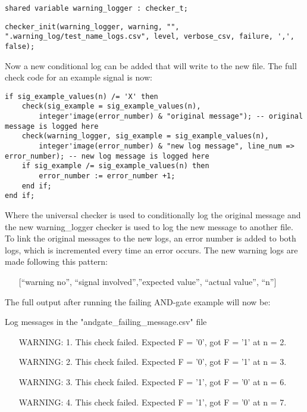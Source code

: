 \begin{lstlisting}[style=vhdl, caption={Custom checker declaration}, label={vhdl:new_checker_declaration}]
shared variable warning_logger : checker_t;
\end{lstlisting}\noindent
\begin{lstlisting}[style=vhdl, caption={Custom checker initialisation}, label={vhdl:new_checker_init}]
checker_init(warning_logger, warning, "", ".warning_log/test_name_logs.csv", level, verbose_csv, failure, ',', false);
\end{lstlisting}\noindent
Now a new conditional log can be added that will write to the new file. The full check code for an example signal is now:
\begin{lstlisting}[style=vhdl, caption={Improved signal checking}, label={vhdl:improved_check}]
if sig_example_values(n) /= 'X' then
	check(sig_example = sig_example_values(n), 
		integer'image(error_number) & "original message"); -- original message is logged here
	check(warning_logger, sig_example = sig_example_values(n), 
		integer'image(error_number) & "new log message", line_num => error_number); -- new log message is logged here
	if sig_example /= sig_example_values(n) then
		error_number := error_number +1;
	end if;
end if;
\end{lstlisting}\noindent
Where the universal checker is used to conditionally log the original message and the new warning\_logger checker is used to log the new message to another file. To link the original messages to the new logs, an error number is added to both logs, which is incremented every time an error occurs.
\newpage\noindent
The new warning logs are made following this pattern:%
\begin{customenv}
	\begin{itemize}
		\centering
		\item [] [“warning no”, “signal involved”,”expected value”, “actual value”, “n”] 
	\end{itemize}
\end{customenv}\nline
The full output after running the failing AND-gate example will now be:
\begin{customenv}
	\caption{Log messages in the "andgate\_failing\_message.csv" file}
	\begin{itemize}
		\centering
		\item [WARNING: 1.] This check failed. Expected F = '0', got F = '1' at n = 2.
		\item [WARNING: 2.] This check failed. Expected F = '0', got F = '1' at n = 3.
		\item [WARNING: 3.] This check failed. Expected F = '1', got F = '0' at n = 6.
		\item [WARNING: 4.] This check failed. Expected F = '1', got F = '0' at n = 7.
	\end{itemize}
\end{customenv}
